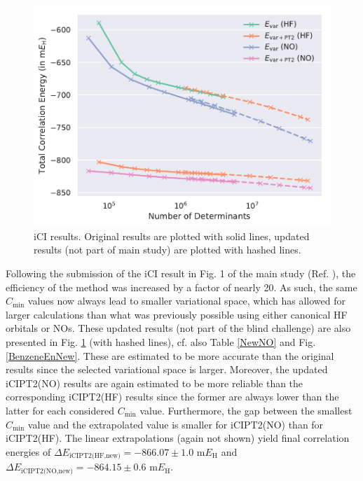 \documentclass[journal=jcp,manuscript=suppinfo]{achemso}
\begin{document}
%
\begin{figure}[ht!]
\begin{center}
\includegraphics[scale=0.75]{figures/ici/ici.pdf}
\caption{iCI results. Original results are plotted with solid lines, updated results (not part of main study) are plotted with hashed lines.}
\label{ici_SI_fig}
\end{center}
\vspace{-0.6cm}
\end{figure}
%
Following the submission of the iCI result in Fig. 1 of the main study (Ref. ), the efficiency of the method was increased by a factor of nearly 20. As such, the same $C_{\text{min}}$ values now always lead to smaller variational space, which has allowed for larger calculations than what was previously possible using either canonical HF orbitals or NOs. These updated results (not part of the blind challenge) are also presented in Fig. \ref{ici_SI_fig} (with hashed lines), cf. also Table \ref{NewNO} and Fig. \ref{BenzeneEnNew}. These are estimated to be more accurate than the original results since the selected variational space is larger. Moreover, the updated iCIPT2(NO) results are again estimated to be more reliable than the corresponding iCIPT2(HF) results since the former are always lower than the latter for each considered $C_{\text{min}}$ value. Furthermore, the gap between the smallest $C_{\text{min}}$ value and the extrapolated value is smaller for iCIPT2(NO) than for iCIPT2(HF). The linear extrapolations (again not shown) yield final correlation energies of $\Delta E_{\text{iCIPT2(HF,new)}} = -866.07\pm1.0$ m$E_{\text{H}}$ and $\Delta E_{\text{iCIPT2(NO,new)}} = -864.15\pm0.6$ m$E_{\text{H}}$.\\
\end{document}
